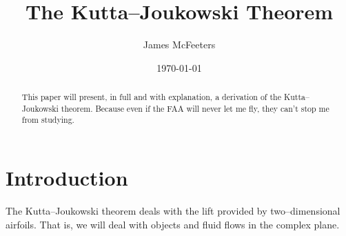 \documentclass[letterpaper, twoside, 12 pt]{article}
\title{The Kutta--Joukowski Theorem}
\date{\today}
\author{James McFeeters}
\begin{document}
	\maketitle
	\setcounter{y}{0}

\begin{abstract}
	This paper will present, in full and with explanation, a derivation of the Kutta--Joukowski theorem.
	Because even if the FAA will never let me fly, they can't stop me from studying.
\end{abstract}

\section{Introduction} %
\label{sec:introduction}
	The Kutta--Joukowski theorem deals with the lift provided by two--dimensional airfoils.
	That is, we will deal with objects and fluid flows in the complex plane.
\end{document}
